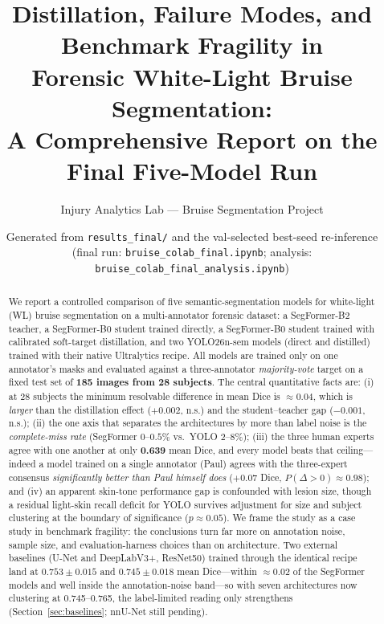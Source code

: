 \documentclass[11pt]{article}
\title{\bfseries Distillation, Failure Modes, and Benchmark Fragility in\\
Forensic White-Light Bruise Segmentation:\\
\large A Comprehensive Report on the Final Five-Model Run}
\author{Injury Analytics Lab --- Bruise Segmentation Project}
\date{Generated from \texttt{results\_final/} and the val-selected best-seed re-inference\\
(final run: \texttt{bruise\_colab\_final.ipynb}; analysis: \texttt{bruise\_colab\_final\_analysis.ipynb})}
\newcommand{\ns}{n.s.}
\begin{document}
\maketitle

\begin{abstract}
\noindent
We report a controlled comparison of five semantic-segmentation models for
white-light (WL) bruise segmentation on a multi-annotator forensic dataset: a
SegFormer-B2 teacher, a SegFormer-B0 student trained directly, a SegFormer-B0
student trained with calibrated soft-target distillation, and two YOLO26n-sem
models (direct and distilled) trained with their native Ultralytics recipe. All
models are trained only on one annotator's masks and evaluated against a
three-annotator \emph{majority-vote} target on a fixed test set of
\textbf{185 images from 28 subjects}. The central quantitative facts are: (i) at
28 subjects the minimum resolvable difference in mean Dice is $\approx 0.04$,
which is \emph{larger} than the distillation effect ($+0.002$, \ns) and the
student--teacher gap ($-0.001$, \ns); (ii) the one axis that separates the
architectures by more than label noise is the \emph{complete-miss rate}
(SegFormer $0$--$0.5\%$ vs.\ YOLO $2$--$8\%$); (iii) the three human experts agree
with one another at only \textbf{0.639} mean Dice, and every model beats that
ceiling---indeed a model trained on a single annotator (Paul) agrees with the
three-expert consensus \emph{significantly better than Paul himself does}
($+0.07$ Dice, $P(\Delta{>}0)\approx0.98$); and (iv) an apparent skin-tone
performance gap is confounded with lesion size, though a residual light-skin
recall deficit for YOLO survives adjustment for size and subject clustering at
the boundary of significance ($p\approx0.05$). We frame the study as a case
study in benchmark fragility: the conclusions turn far more on annotation noise,
sample size, and evaluation-harness choices than on architecture. Two external
baselines (U-Net and DeepLabV3+, ResNet50) trained through the identical recipe land at
$0.753\pm0.015$ and $0.745\pm0.018$ mean Dice---within $\approx$0.02 of the SegFormer
models and well inside the annotation-noise band---so with seven architectures now
clustering at 0.745--0.765, the label-limited reading only strengthens
(Section~\ref{sec:baselines}; nnU-Net still pending).
\end{abstract}

\tableofcontents
\bigskip

\end{document}
